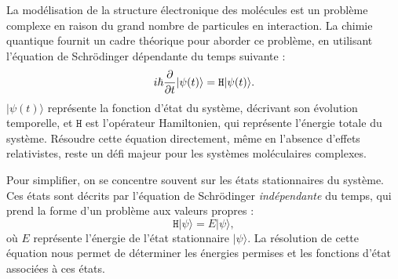 \documentclass[12pt,a4paper]{article} %
\numberwithin{equation}{section} %
\numberwithin{figure}{section} %
\numberwithin{table}{section} %
\begin{document}
La modélisation de la structure électronique des molécules est un problème complexe en raison du grand nombre de particules en interaction. La chimie quantique fournit un cadre théorique pour aborder ce problème, en utilisant l'équation de Schrödinger dépendante du temps suivante :
\begin{equation}
i\hbar \pdv{t} |\psi(t)\rangle = \mathtt{H} |\psi(t)\rangle .
\end{equation}
$|\psi(t)\rangle$ représente la fonction d'état du système, décrivant son évolution temporelle, et $\mathtt{H}$ est l'opérateur Hamiltonien, qui représente l'énergie totale du système. Résoudre cette équation directement, même en l'absence d'effets relativistes, reste un défi majeur pour les systèmes moléculaires complexes.

Pour simplifier, on se concentre souvent sur les états stationnaires du système. Ces états sont décrits par l'équation de Schrödinger \textit{indépendante} du temps, qui prend la forme d'un problème aux valeurs propres :
\begin{equation}
\mathtt{H} |\psi\rangle = E |\psi\rangle ,
\end{equation}
où $E$ représente l'énergie de l'état stationnaire $|\psi\rangle$. La résolution de cette équation nous permet de déterminer les énergies permises et les fonctions d'état associées à ces états.
\end{document}
